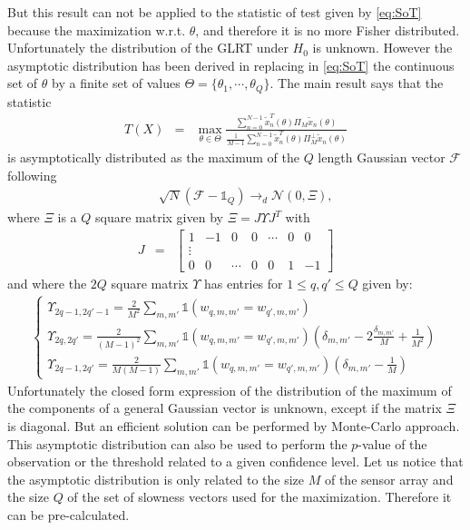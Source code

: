 \documentclass[graybox]{svmult/styles/svmult}
\def\cF{{\mathcal{F}}}
\begin{document}
But this result can not be applied to the statistic of test given by \eqref{eq:SoT} because the maximization w.r.t. $\theta$, and therefore it is no more Fisher distributed. Unfortunately the distribution of the GLRT under $H_{0}$ is unknown. However the asymptotic distribution has been derived in \cite{adrien} replacing in \eqref{eq:SoT} the continuous set of $\theta$ by a finite set of values $\Theta=\{\theta_{1},\cdots,\theta_{Q}\}$. The main result says that  the statistic 
\begin{eqnarray}
 \label{eq:SoTdiscrete}
 T(X) &=& \max_{\theta\in \Theta}
 \frac{\sum_{n=0}^{N-1}\tilde x_{n}^{T}(\theta)\Pi_{M} \tilde x_{n}(\theta)}
        {\frac{1}{M-1}\sum_{n=0}^{N-1}\tilde x_{n}^{T}(\theta)\Pi_{M}^{\perp}\tilde x_{n}(\theta)}
 \end{eqnarray}
is asymptotically distributed as the maximum of the $Q$ length Gaussian vector $\cF$  following 
\begin{eqnarray}
\label{eq:CLTonFN}
&&\sqrt{N}(\cF-\mathds{1}_{Q})
\rightarrow_{d}
\mathcal{N}\left(0,\Xi\right), 
\end{eqnarray}
where $\Xi$  is a $Q$ square matrix given by $\Xi=J\Upsilon J^{T}$ 
with
\begin{eqnarray}
\label{eq:jacobianYonW}
J&=&
\begin{bmatrix}
1&-1&0&0&\cdots&0&0
\\
 \vdots
\\
0&0&\cdots&0&0&1&-1
\end{bmatrix}
\end{eqnarray}
and where the $2Q$ square matrix $\Upsilon$ has entries  for $1\leq q,q'\leq Q$ given by:
\begin{eqnarray}
\label{eq:oo2}
\left \{
 \begin{array}{lll}
 \Upsilon_{2q-1,2q'-1}=
 \frac{2}{M^{2}} \sum_{m,m'} \mathds{1}(w_{q,m,m'}=w_{q',m,m'})
\\
\Upsilon_{2q,2q'}
 =
  \frac{2}{(M-1)^{2}}  \sum_{m,m'} \mathds{1}(w_{q,m,m'}=w_{q',m,m'})(\delta_{m,m'}-
   2\frac{\delta_{m,m'}}{M}+\frac{1}{M^{2}})
\\
 \Upsilon_{2q-1,2q'}
 = \frac{2}{M(M-1)} \sum_{m,m'} \mathds{1}
 (w_{q,m,m'}=w_{q',m,m'})(\delta_{m,m'}-\frac{1}{M})
 \end{array}
 \right.
\end{eqnarray}
Unfortunately the closed form expression of the distribution of the maximum of the components of a general Gaussian vector is unknown, except if the matrix $\Xi$ is  diagonal. But an efficient solution can be performed by Monte-Carlo approach. This asymptotic distribution can also be used to perform the $p$-value of the observation  or the  threshold related to a given confidence level. Let us notice that the asymptotic distribution is only related to the size $M$ of the sensor array and the size $Q$ of the set of slowness vectors used for the maximization. Therefore it can be pre-calculated.
\end{document}
